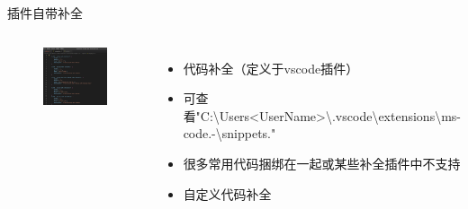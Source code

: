 \documentclass{beamer}
\begin{document}
\begin{frame}{插件自带补全}
    \begin{columns}
        \begin{figure}[htbp]
            \centering
            \includegraphics[scale=0.12]{pic/extension_sample.png}
        \end{figure}
        \begin{itemize}
            \item 代码补全（定义于vscode插件）
            \item 可查看"C:\textbackslash Users<UserName>\textbackslash.vscode\textbackslash extensions\textbackslash ms-code.-\textbackslash snippets."
            \item 很多常用代码捆绑在一起或某些补全插件中不支持
            \item 自定义代码补全
        \end{itemize}
    \end{columns}
\end{frame}
\end{document}
